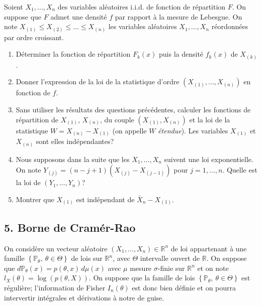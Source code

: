 \documentclass[a4paper,11pt,fleqn]{article}
\newcommand{\R}{\ensuremath{\mathbb{R}}}
\newcommand{\1}{\ensuremath{\mathbbm{1}}}
\newcommand{\p}{\ensuremath{\mathbb{P}}}
\newcommand{\ac}[1]{\left\{#1\right\}}
\begin{document}
Soient $X_1, \ldots,X_n$ des variables al\'eatoires i.i.d. de
fonction de r\'epartition $F$. On suppose que $F$ admet une
densit\'e $f$ par rapport \`a la mesure de Lebesgue. On note $X_{(1)}\leq X_{(2)}\leq\ldots\leq X_{(n)}$ les variables al\'eatoires $X_1, \ldots,X_n$ r\'eordonn\'ees par ordre croissant.
\begin{enumerate}
\item D\'eterminer la fonction de r\'epartition $F_{k}(x)$ puis la densit\'e $f_k(x) $ de $X_{(k)}$.
\item
Donner l'expression de la loi de la statistique d'ordre
$(X_{(1)},\ldots,X_{(n)})$ en fonction de $f$.
\item Sans utiliser les r\'esultats des questions pr\'ec\'edentes,
calculer les fonctions de r\'epartition de $X_{(1)}$, $X_{(n)}$,
du couple $(X_{(1)}, X_{(n)})$ et la loi de la statistique $W=
X_{(n)}- X_{(1)}$ (on appelle $W$ {\it \'etendue}). Les
variables $X_{(1)}$ et $X_{(n)}$ sont elles ind\'ependantes?
\item Nous supposons dans la suite que les $X_{1},\ldots,X_{n}$ suivent une loi exponentielle.
On note $Y_{(j)}=(n-j+1)(X_{(j)}-X_{(j-1)})$ pour $j=1,\ldots,n$. Quelle est la loi de $(Y_{1},\ldots,Y_{n})$?
\item Montrer que $X_{(1)}$ est ind\'ependant de $\bar X_{n}-X_{(1)}$.
\end{enumerate}

\subsection*{5. Borne de Cram\'er-Rao}
On consid\`ere un vecteur al\'eatoire $(X_{1},\ldots,X_{n})\in\R^n$ de loi appartenant \`a une famille $\ac{\p_{\theta},\ \theta\in\Theta}$ de lois sur $\R^n$, avec $\Theta$ intervalle ouvert de $\R$. On suppose que $d\p_{\theta}(x)=p(\theta,x)\,d\mu(x)$ avec $\mu$ mesure $\sigma$-finie sur $\R^n$ et on note $l_{X}(\theta)=\log(p(\theta,X))$. On suppose que la famille de lois $\ac{\p_{\theta},\ \theta\in\Theta}$ est r\'eguli\`ere;   l'information de Fisher $I_{n}(\theta)$ est donc bien d\'efinie et on pourra intervertir int\'egrales et d\'erivations \`a notre de guise. 
\end{document}
